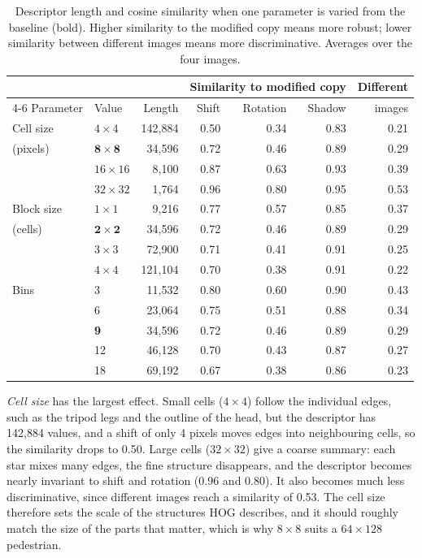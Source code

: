 \begin{table}[H]
    \centering
    \begin{tabular}{llrrrrr}
        \toprule
        & & & \multicolumn{3}{c}{Similarity to modified copy} & Different \\
        \cmidrule(lr){4-6}
        Parameter & Value & Length & Shift & Rotation & Shadow & images \\
        \midrule
        Cell size & $4\times4$ & 142,884 & 0.50 & 0.34 & 0.83 & 0.21 \\
        (pixels) & $\mathbf{8\times8}$ & 34,596 & 0.72 & 0.46 & 0.89 & 0.29 \\
        & $16\times16$ & 8,100 & 0.87 & 0.63 & 0.93 & 0.39 \\
        & $32\times32$ & 1,764 & 0.96 & 0.80 & 0.95 & 0.53 \\
        \midrule
        Block size & $1\times1$ & 9,216 & 0.77 & 0.57 & 0.85 & 0.37 \\
        (cells) & $\mathbf{2\times2}$ & 34,596 & 0.72 & 0.46 & 0.89 & 0.29 \\
        & $3\times3$ & 72,900 & 0.71 & 0.41 & 0.91 & 0.25 \\
        & $4\times4$ & 121,104 & 0.70 & 0.38 & 0.91 & 0.22 \\
        \midrule
        Bins & 3 & 11,532 & 0.80 & 0.60 & 0.90 & 0.43 \\
        & 6 & 23,064 & 0.75 & 0.51 & 0.88 & 0.34 \\
        & \textbf{9} & 34,596 & 0.72 & 0.46 & 0.89 & 0.29 \\
        & 12 & 46,128 & 0.70 & 0.43 & 0.87 & 0.27 \\
        & 18 & 69,192 & 0.67 & 0.38 & 0.86 & 0.23 \\
        \bottomrule
    \end{tabular}
    \caption{Descriptor length and cosine similarity when one parameter is varied from the baseline (bold). Higher similarity to the modified copy means more robust; lower similarity between different images means more discriminative. Averages over the four images.}
    \label{tab:hog-params}
\end{table}

\emph{Cell size} has the largest effect. Small cells ($4\times4$) follow the individual edges, such as the tripod legs and the outline of the head, but the descriptor has 142,884 values, and a shift of only 4 pixels moves edges into neighbouring cells, so the similarity drops to 0.50. Large cells ($32\times32$) give a coarse summary: each star mixes many edges, the fine structure disappears, and the descriptor becomes nearly invariant to shift and rotation (0.96 and 0.80). It also becomes much less discriminative, since different images reach a similarity of 0.53. The cell size therefore sets the scale of the structures HOG describes, and it should roughly match the size of the parts that matter, which is why $8\times8$ suits a $64\times128$ pedestrian.

